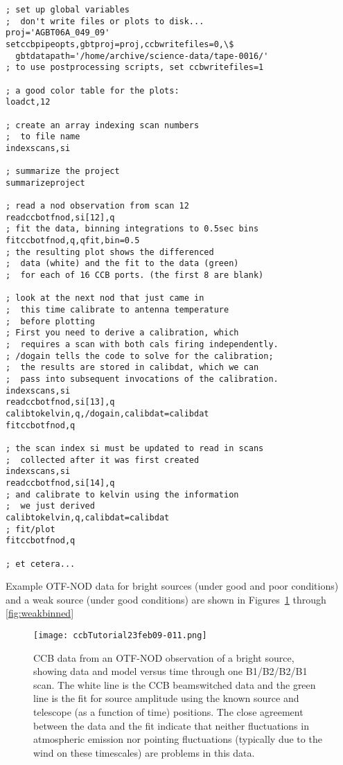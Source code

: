 \begin{lstlisting}
; set up global variables
;  don't write files or plots to disk...
proj='AGBT06A_049_09'
setccbpipeopts,gbtproj=proj,ccbwritefiles=0,\$
  gbtdatapath='/home/archive/science-data/tape-0016/'
; to use postprocessing scripts, set ccbwritefiles=1

; a good color table for the plots:
loadct,12

; create an array indexing scan numbers
;  to file name
indexscans,si

; summarize the project
summarizeproject

; read a nod observation from scan 12
readccbotfnod,si[12],q
; fit the data, binning integrations to 0.5sec bins
fitccbotfnod,q,qfit,bin=0.5
; the resulting plot shows the differenced
;  data (white) and the fit to the data (green)
;  for each of 16 CCB ports. (the first 8 are blank)

; look at the next nod that just came in
;  this time calibrate to antenna temperature
;  before plotting
; First you need to derive a calibration, which
;  requires a scan with both cals firing independently.
; /dogain tells the code to solve for the calibration;
;  the results are stored in calibdat, which we can
;  pass into subsequent invocations of the calibration.
indexscans,si
readccbotfnod,si[13],q
calibtokelvin,q,/dogain,calibdat=calibdat
fitccbotfnod,q

; the scan index si must be updated to read in scans
;  collected after it was first created
indexscans,si
readccbotfnod,si[14],q
; and calibrate to kelvin using the information
;  we just derived
calibtokelvin,q,calibdat=calibdat
; fit/plot
fitccbotfnod,q

; et cetera...

\end{lstlisting}

Example OTF-NOD data for bright sources (under good and poor
conditions) and a weak source (under good conditions)
are shown in Figures~\ref{fig:brightgood} through
\ref{fig:weakbinned}

\begin{figure}
\texttt{[image: ccbTutorial23feb09-011.png]}
\caption[CCB data from an OTF-NOD observation of a bright source]
{CCB data from an OTF-NOD observation of a bright source, showing data and model
versus time through one B1/B2/B2/B1 scan. The white line is the CCB
beamswitched data and the green line is the fit for source amplitude
using the known source and telescope (as a function of time)
positions. The close agreement between the data and the fit indicate
that neither fluctuations in atmospheric emission nor pointing
fluctuations (typically due to the wind on these timescales) are
problems in this data.}
\label{fig:brightgood}
\end{figure}


